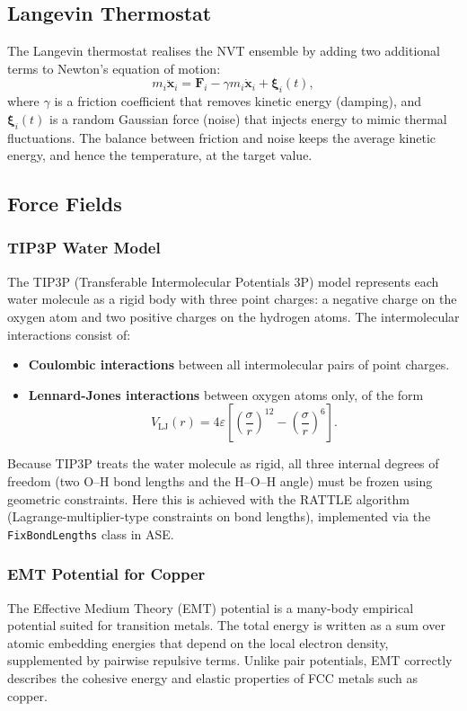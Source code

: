 \documentclass[a4paper,12pt]{scrartcl}
\begin{document}
\subsection{Langevin Thermostat}
The Langevin thermostat realises the NVT ensemble by adding two additional terms to Newton's equation of motion:
\begin{equation}
    m_i \ddot{\mathbf{x}}_i = \mathbf{F}_i - \gamma m_i \dot{\mathbf{x}}_i + \boldsymbol{\xi}_i(t),
\end{equation}
where $\gamma$ is a friction coefficient that removes kinetic energy (damping), and $\boldsymbol{\xi}_i(t)$ is a random Gaussian force (noise) that injects energy to mimic thermal fluctuations. The balance between friction and noise keeps the average kinetic energy, and hence the temperature, at the target value.

\subsection{Force Fields}
\subsubsection{TIP3P Water Model}
The TIP3P (Transferable Intermolecular Potentials 3P) model represents each water molecule as a rigid body with three point charges: a negative charge on the oxygen atom and two positive charges on the hydrogen atoms. The intermolecular interactions consist of:
\begin{itemize}
    \item \textbf{Coulombic interactions} between all intermolecular pairs of point charges.
    \item \textbf{Lennard-Jones interactions} between oxygen atoms only, of the form
    \begin{equation}
        V_\mathrm{LJ}(r) = 4\varepsilon\left[\left(\frac{\sigma}{r}\right)^{12} - \left(\frac{\sigma}{r}\right)^6\right].
    \end{equation}
\end{itemize}
Because TIP3P treats the water molecule as rigid, all three internal degrees of freedom (two O--H bond lengths and the H--O--H angle) must be frozen using geometric constraints. Here this is achieved with the RATTLE algorithm (Lagrange-multiplier-type constraints on bond lengths), implemented via the \texttt{FixBondLengths} class in ASE.

\subsubsection{EMT Potential for Copper}
The Effective Medium Theory (EMT) potential is a many-body empirical potential suited for transition metals. The total energy is written as a sum over atomic embedding energies that depend on the local electron density, supplemented by pairwise repulsive terms. Unlike pair potentials, EMT correctly describes the cohesive energy and elastic properties of FCC metals such as copper.
\end{document}
